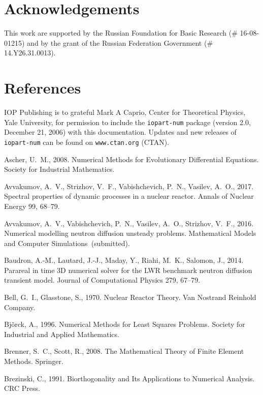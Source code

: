 \documentclass[a4paper]{jpconf}
\begin{document}
\section*{Acknowledgements}
This work are supported by the Russian Foundation for Basic Research (\# 16-08-01215) and by the grant of the Russian Federation Government (\# 14.Y26.31.0013).

\section*{References}
\begin{thebibliography}{50}

 IOP Publishing is to grateful Mark A Caprio, Center for Theoretical Physics, Yale University, for permission to include the {\tt iopart-num} \BibTeX package (version 2.0, December 21, 2006) with  this documentation. Updates and new releases of {\tt iopart-num} can be found on \verb"www.ctan.org" (CTAN). 

Ascher, U.~M., 2008. Numerical Methods for Evolutionary Differential Equations.
  Society for Industrial Mathematics.

Avvakumov, A.~V., Strizhov, V.~F., Vabishchevich, P.~N., Vasilev, A.~O., 2017.
  Spectral properties of dynamic processes in a nuclear reactor. Annals of
  Nuclear Energy 99, 68--79.

Avvakumov, A.~V., Vabishchevich, P.~N., Vasilev, A.~O., Strizhov, V.~F., 2016.
  Numerical modelling neutron diffusion unsteady problems. Mathematical Models
  and Computer Simulations~(submitted).

Baudron, A.-M., Lautard, J.-J., Maday, Y., Riahi, M.~K., Salomon, J., 2014.
  Parareal in time {3D} numerical solver for the {LWR} benchmark neutron
  diffusion transient model. Journal of Computational Physics 279, 67--79.

Bell, G.~I., Glasstone, S., 1970. Nuclear Reactor Theory. Van Nostrand Reinhold
  Company.

Bjõrck, A., 1996. Numerical Methods for Least Squares Problems. Society for
  Industrial and Applied Mathematics.

Brenner, S.~C., Scott, R., 2008. The Mathematical Theory of Finite Element
  Methods. Springer.

Brezinski, C., 1991. Biorthogonality and Its Applications to Numerical
  Analysis. CRC Press.


\end{thebibliography}
\end{document}

